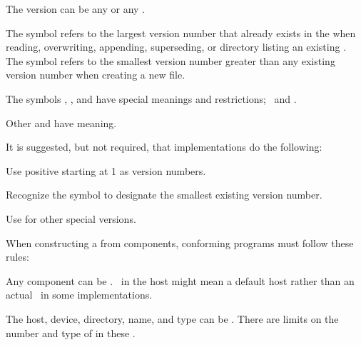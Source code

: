 \endsubsubsubsection%


The version can be any  or any .  

The symbol  refers to the largest version number 
that already exists in the 
when reading, overwriting, appending, superseding, or directory listing 
an existing .
The symbol  refers to the smallest version number
greater than any existing version number when creating a new file.

The symbols \nil, , and  have special meanings and
restrictions; \seesection\SpecialComponentValues\ and \secref\ConstructingPathnames.

Other  and 
have  meaning.


It is suggested, but not required, that implementations do the following:

\beginlist

\itemitem{\bull} Use positive  starting at 1 as version numbers.

\itemitem{\bull} Recognize the symbol 
		 to designate the smallest existing version number.

\itemitem{\bull} Use  for other special versions.

\endlist

\endsubsubsubsection%

\endsubsubsection%


  When constructing a  from components, conforming programs
  must follow these rules:
  
\beginlist

\itemitem{\bull}
  Any component can be \nil.
  \nil\ in the host might mean a default host 
  rather than an actual \nil\ in some implementations.
           
\itemitem{\bull}
  The host, device, directory, name, and type can be .  There
  are  limits on the number and type of
   in these .
  
